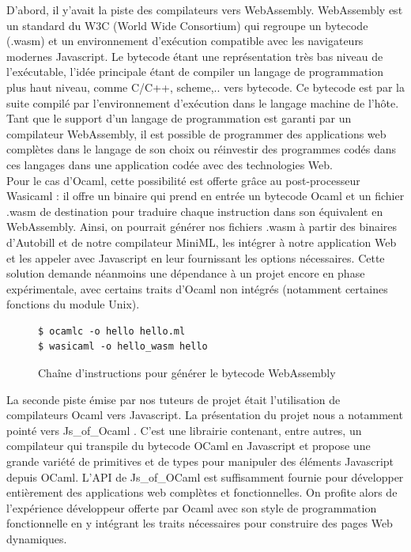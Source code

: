 \documentclass[12pt]{article}
\begin{document}
D'abord, il y'avait la piste des compilateurs vers WebAssembly. WebAssembly est un standard du W3C (World Wide Consortium) qui regroupe un bytecode (.wasm) et un environnement d'exécution compatible avec les navigateurs modernes Javascript. Le bytecode étant une représentation très bas niveau de l'exécutable, l'idée principale étant de compiler un langage de programmation plus haut niveau, comme C/C++, scheme,.. vers bytecode. Ce bytecode est par la suite compilé par l'environnement d'exécution dans le langage machine de l'hôte. Tant que le support d'un langage de programmation est garanti par un compilateur WebAssembly, il est possible de programmer des applications web complètes dans le langage de son choix ou réinvestir des programmes codés dans ces langages dans une application codée avec des technologies Web. \\
Pour le cas d'Ocaml, cette possibilité est offerte grâce au post-processeur Wasicaml\cite{wasicaml} : il offre un binaire qui prend en entrée un bytecode Ocaml et un fichier .wasm de destination pour traduire chaque instruction dans son équivalent en WebAssembly. Ainsi, on pourrait générer nos fichiers .wasm à partir des binaires d'Autobill et de notre compilateur MiniML, les intégrer à notre application Web et les appeler avec Javascript en leur fournissant les options nécessaires. Cette solution demande néanmoins une dépendance à un projet encore en phase expérimentale, avec certains traits d'Ocaml non intégrés (notamment certaines fonctions du module Unix).\\
\begin{figure}
      \begin{lstlisting}
$ ocamlc -o hello hello.ml
$ wasicaml -o hello_wasm hello
\end{lstlisting}
      \caption{Chaîne d'instructions pour générer le bytecode WebAssembly}
\end{figure}

La seconde piste émise par nos tuteurs de projet était l'utilisation de compilateurs Ocaml vers Javascript. La présentation du projet nous a notamment pointé vers Js\_of\_Ocaml \cite{js_of_ocaml}. C'est une librairie contenant, entre autres, un compilateur qui transpile du bytecode OCaml en Javascript et propose une grande variété de primitives et de types pour manipuler des éléments Javascript depuis OCaml. L'API de Js\_of\_OCaml est suffisamment fournie pour développer entièrement des applications web complètes et fonctionnelles. On profite alors de l'expérience développeur offerte par Ocaml avec son style de programmation fonctionnelle en y intégrant les traits nécessaires pour construire des pages Web dynamiques.\\
\end{document}
